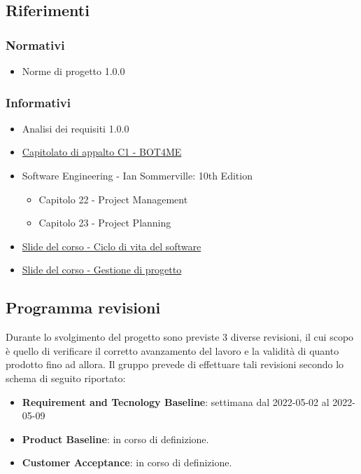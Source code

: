 \subsection{Riferimenti}

\subsubsection{Normativi}
\begin{itemize}
    \item Norme di progetto 1.0.0
\end{itemize}

\subsubsection{Informativi}
\begin{itemize}
    \item Analisi dei requisiti 1.0.0
    \item  \href{https://www.math.unipd.it/~tullio/IS-1/2021/Progetto/C1.pdf}{\color{blue} Capitolato di appalto C1 - BOT4ME}
    \item Software Engineering - Ian Sommerville: 10th Edition
    \begin{itemize}
        \item Capitolo 22 - Project Management
        \item Capitolo 23 - Project Planning
    \end{itemize}
    \item \href{https://www.math.unipd.it/~tullio/IS-1/2021/Dispense/T05.pdf}{\color{blue} Slide del corso - Ciclo di vita del software}
    \item \href{https://www.math.unipd.it/~tullio/IS-1/2021/Dispense/T06.pdf}{\color{blue} Slide del corso - Gestione di progetto}
\end{itemize}

\subsection{Programma revisioni}
Durante lo svolgimento del progetto sono previste 3 diverse revisioni, il cui scopo è quello di verificare il corretto avanzamento del lavoro e la validità di quanto prodotto fino ad allora. 
Il gruppo prevede di effettuare tali revisioni secondo lo schema di seguito riportato: 
\begin{itemize}
    \item \textbf{Requirement and Tecnology Baseline}: settimana dal    2022-05-02 al 2022-05-09
    \item \textbf{Product Baseline}: in corso di definizione.
    \item \textbf{Customer Acceptance}: in corso di definizione.
\end{itemize}
\newpage
